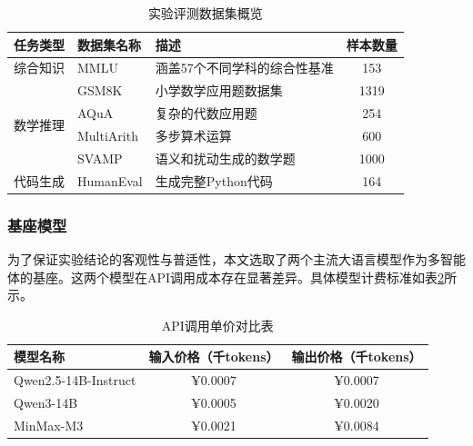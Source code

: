 \vspace{26pt}
\begin{table}[H]
    \centering
    {
        \fontsize{12pt}{26pt}\selectfont
        \begin{tabular}{|c|p{3.5cm}|p{6.5cm}|c|}
            \hline
            任务类型 & 数据集名称 & 描述 & 样本数量\\
            \hline
            综合知识 & MMLU\cite{ref61} & 涵盖57个不同学科的综合性基准 & 153 \\
            \hline
            \multirow{4}{*}{数学推理} & GSM8K\cite{ref62} & 小学数学应用题数据集 & 1319 \\
            \cline{2-4} %
             & AQuA\cite{ref63}& 复杂的代数应用题 & 254 \\
            \cline{2-4}
             & MultiArith\cite{ref64} & 多步算术运算 & 600 \\
            \cline{2-4}
             & SVAMP\cite{ref65} & 语义和扰动生成的数学题 & 1000 \\
            \hline
            代码生成 & HumanEval\cite{ref66} & 生成完整Python代码 & 164 \\
            \hline
        \end{tabular}
    }
    \caption{实验评测数据集概览}
    \label{tab:dataset_overview}
\end{table}

\subsubsection{基座模型}
为了保证实验结论的客观性与普适性，本文选取了两个主流大语言模型作为多智能体的基座。这两个模型在API调用成本存在显著差异。具体模型计费标准如表\ref{tab:base_model_api_price}所示。
\vspace{26pt}
\begin{table}[H]
    \centering
    {
        \fontsize{12pt}{26pt}\selectfont
        \begin{tabular}{|l|c|c|}
            \hline
            模型名称 & 输入价格（千tokens） & 输出价格（千tokens）\\
            \hline
            Qwen2.5-14B-Instruct  & ¥0.0007 & ¥0.0007 \\
            \hline
            Qwen3-14B  & ¥0.0005 & ¥0.0020 \\
            \hline
            MinMax-M3  & ¥0.0021 & ¥0.0084 \\
            \hline

        \end{tabular}
    }
    \caption{API调用单价对比表}
    \label{tab:base_model_api_price}
\end{table}

